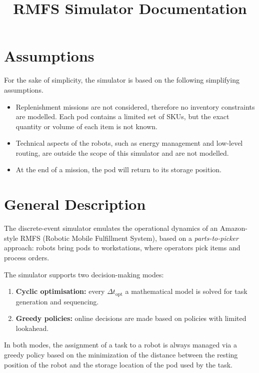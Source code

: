 \documentclass[a4paper,10pt]{article}
\title{\textbf{RMFS Simulator Documentation}}
\author{}
\date{}
\begin{document}
\maketitle
\tableofcontents
\newpage

\section{Assumptions}

For the sake of simplicity, the simulator is based on the following simplifying assumptions.

\begin{itemize}[noitemsep]
    \item Replenishment missions are not considered, therefore no inventory constraints are modelled. Each pod contains a limited set of SKUs, but the exact quantity or volume of each item is not known.
    \item Technical aspects of the robots, such as energy management and low-level routing, are outside the scope of this simulator and are not modelled.
    \item At the end of a mission, the pod will return to its storage position.
\end{itemize}

\section{General Description}
The discrete-event simulator emulates the operational dynamics of an Amazon-style RMFS (Robotic Mobile Fulfillment System), based on a \textit{parts-to-picker} approach: robots bring pods to workstations, where operators pick items and process orders.

The simulator supports two decision-making modes:
\begin{enumerate}[noitemsep]
    \item \textbf{Cyclic optimisation:} every $\Delta t_{\text{opt}}$ a mathematical model is solved for task generation and sequencing.
    \item \textbf{Greedy policies:} online decisions are made based on policies with limited lookahead.
\end{enumerate}

In both modes, the assignment of a task to a robot is always managed via a greedy policy based on the minimization of the distance between the resting position of the robot and the storage location of the pod used by the task.
\end{document}

